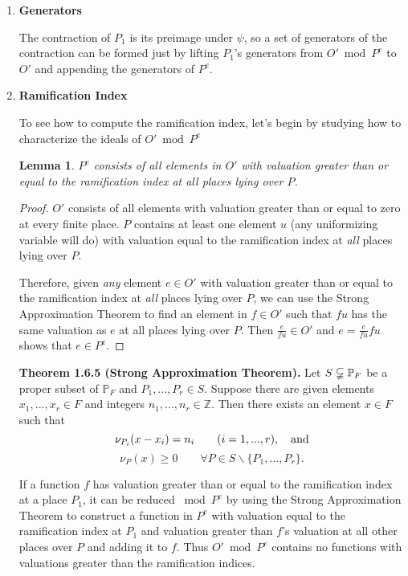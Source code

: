 \documentclass{article}
\newtheorem*{lemma}{Lemma}
\newcommand{\ZZ}{{\mathbb Z}}
\newcommand{\PP}{{\mathbb P}}
\begin{document}
\begin{enumerate}
\item {\bf Generators}

The contraction of $P_1$ is its preimage
under $\psi$, so a set of generators of the contraction can be formed
just by lifting $P_1$'s generators from $O'\bmod P^e$ to $O'$ and
appending the generators of $P^e$.

\item {\bf Ramification Index}

To see how to compute the ramification
index, let's begin by studying how to characterize the ideals
of $O'\bmod P^e$

\begin{lemma}
$P^e$ consists of all elements in $O'$ with valuation greater than or
equal to the ramification index at {\it all} places lying over $P$.
\end{lemma}
\begin{proof}
$O'$ consists of all elements with valuation greater than or equal to
zero at every finite place.
$P$ contains at least one element $u$ (any uniformizing variable will do) with valuation equal
to the ramification index at {\it all} places lying over $P$.

Therefore, given {\it any} element $e \in O'$ with valuation greater than or
equal to the ramification index at {\it all} places lying over $P$,
we can use the Strong Approximation Theorem to find an element in $f \in O'$
such that $fu$ has the same valuation as $e$ at all places lying over $P$.
Then $\frac{e}{fu} \in O'$ and $e = \frac{e}{fu} f u$ shows that $e \in P^e$.
\end{proof}

\begin{mdframed}
{\bf\cite{stich} Theorem 1.6.5 (Strong Approximation Theorem).}
Let $S \varsubsetneqq \PP_F$ be
a proper subset of $\PP_F$ and $P_1 , ... , P_r \in S$. Suppose there are given elements
$x_1 , ... , x_r \in F$ and integers $n_1 , ... , n_r \in \ZZ$. Then there exists an element
$x \in F$ such that
$$\nu_{P_i} (x - x_i ) = n_i \qquad (i=1,...,r), \quad{\rm and}$$
$$\nu_P (x) \ge 0 \qquad \forall P \in S \backslash \{P_1 , ... , P_r\}.$$
\end{mdframed}

If a function $f$ has valuation greater than or equal to the
ramification index at a place $P_1$, it can be reduced $\bmod P^e$ by
using the Strong Approximation Theorem to construct a function in
$P^e$ with valuation equal to the ramification index at $P_1$ and
valuation greater than $f$'s valuation at all other places over $P$
and adding it to $f$.  Thus $O' \bmod P^e$ contains no functions with
valuations greater than the ramification indices.


\end{enumerate}
\end{document}
